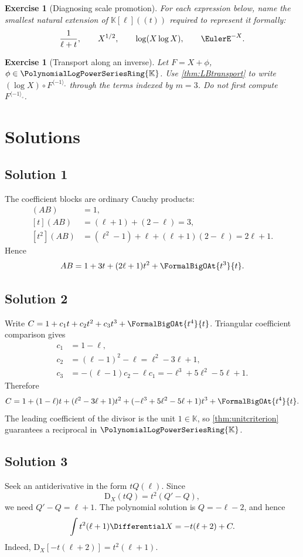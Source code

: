 \documentclass[11pt,oneside,openany]{book}
\newtheorem{exercise}[theorem]{Exercise}
\newcommand{\K}{\mathbb{K}}
\newcommand{\Rring}{\PolynomialLogPowerSeriesRing{\K}}
\newcommand{\compose}{\mathbin{\circ}}
\newcommand{\rev}{^{\langle-1\rangle_{\circ}}}
\newcommand{\D}{\mathrm{D}}
\begin{document}
\begin{exercise}[Diagnosing scale promotion]
For each expression below, name the smallest natural extension of
\(\K[\ell]((t))\) required to represent it formally:
\[
 \frac1{\ell+t},
 \qquad X^{1/2},
 \qquad \log(X\log X),
 \qquad \EulerE^{-X}.
\]
\end{exercise}

\begin{exercise}[Transport along an inverse]
Let \(F=X+\phi\), \(\phi\in\Rring\).  Use
\cref{thm:LBtransport} to write \((\log X)\compose F\rev\) through the
terms indexed by \(m=3\).  Do not first compute \(F\rev\).
\end{exercise}

\section{Solutions}

\subsection*{Solution 1}
The coefficient blocks are ordinary Cauchy products:
\begin{align*}
 [t^0](AB)&=1,\\
 [t](AB)&=(\ell+1)+(2-\ell)=3,\\
 [t^2](AB)&=(\ell^2-1)+\ell+(\ell+1)(2-\ell)=2\ell+1.
\end{align*}
Hence
\[
 AB=1+3t+(2\ell+1)t^2+\FormalBigOAt{t^3}{t}.
\]

\subsection*{Solution 2}
Write \(C=1+c_1t+c_2t^2+c_3t^3+\FormalBigOAt{t^4}{t}\).  Triangular coefficient
comparison gives
\begin{align*}
 c_1&=1-\ell,\\
 c_2&=(\ell-1)^2-\ell=\ell^2-3\ell+1,\\
 c_3&=-(\ell-1)c_2-\ell c_1
 =-\ell^3+5\ell^2-5\ell+1.
\end{align*}
Therefore
\[
 C=1+(1-\ell)t+(\ell^2-3\ell+1)t^2
 +(-\ell^3+5\ell^2-5\ell+1)t^3+\FormalBigOAt{t^4}{t}.
\]
The leading coefficient of the divisor is the unit \(1\in\K\), so
\cref{thm:unitcriterion} guarantees a reciprocal in \(\Rring\).

\subsection*{Solution 3}
Seek an antiderivative in the form \(tQ(\ell)\).  Since
\[
 \D_X(tQ)=t^2(Q'-Q),
\]
we need \(Q'-Q=\ell+1\).  The polynomial solution is
\(Q=-\ell-2\), and hence
\[
 \int t^2(\ell+1)\Differential X=-t(\ell+2)+C.
\]
Indeed,
\(\D_X[-t(\ell+2)]=t^2(\ell+1)\).
\end{document}
